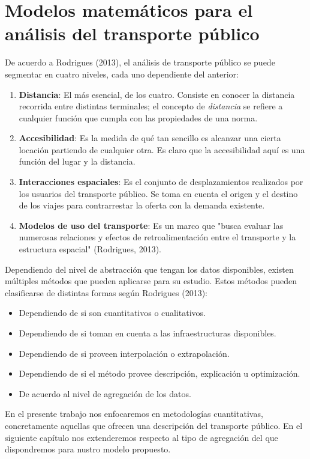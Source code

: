 \documentclass[openany]{book}
\begin{document}
	\section{Modelos matemáticos para el análisis del transporte público}
		De acuerdo a Rodrigues (2013), el análisis de transporte público se puede segmentar en cuatro niveles, cada uno dependiente del anterior:
		\begin{enumerate}
			\item \textbf{Distancia}: El más esencial, de los cuatro. Consiste en conocer la distancia recorrida entre distintas terminales; el concepto de \textit{distancia} se refiere a cualquier función que cumpla con las propiedades de una norma. 
			\item \textbf{Accesibilidad}: Es la medida de qué tan sencillo es alcanzar una cierta locación partiendo de cualquier otra. Es claro que la accesibilidad aquí es una función del lugar y la distancia. 
			\item \textbf{Interacciones espaciales}: Es el conjunto de desplazamientos realizados por los usuarios del transporte público. Se toma en cuenta el origen y el destino de los viajes para contrarrestar la oferta con la demanda existente.
			\item \textbf{Modelos de uso del transporte}: Es un marco que "busca evaluar las numerosas relaciones y efectos de retroalimentación entre el transporte y la estructura espacial" (Rodrigues, 2013).
		\end{enumerate}

		Dependiendo del nivel de abstracción que tengan los datos disponibles, existen múltiples métodos que pueden aplicarse para su estudio. Estos métodos pueden clasificarse de distintas formas según Rodrigues (2013):
			\begin{itemize}
				\item Dependiendo de si son cuantitativos o cualitativos.
				\item Dependiendo de si toman en cuenta a las infraestructuras disponibles.
				\item Dependiendo de si proveen interpolación o extrapolación.
				\item Dependiendo de si el método provee descripción, explicación u optimización.
				\item De acuerdo al nivel de agregación de los datos.
			\end{itemize}

		En el presente trabajo nos enfocaremos en metodologías cuantitativas, concretamente aquellas que ofrecen una descripción del transporte público. En el siguiente capítulo nos extenderemos respecto al tipo de agregación del que dispondremos para nustro modelo propuesto.
\end{document}

